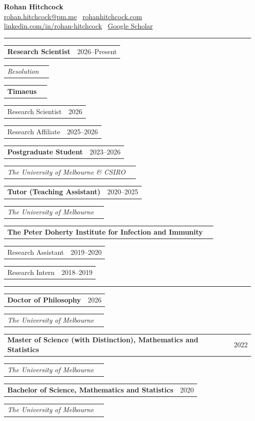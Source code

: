 \documentclass[11pt]{article}
\makeatletter
\newcommand{\resumesection}[1]{\par\needspace{5\baselineskip}\vspace{8pt}{\large\bfseries #1}\par\vspace{3pt}\hrule \vspace{5.5pt}}
\newcommand{\leftright}[2]
{\begin{tabularx}{\linewidth}{l@{\extracolsep{\fill}}r}
	#1 &
	#2 \\
\end{tabularx}}
\newcommand{\role}[1]{\hspace*{1em}#1}
\makeatother
\begin{document}
    \begin{center}
        {\LARGE \textbf{Rohan Hitchcock}}\\
        \href{mailto:rohan.hitchcock@pm.me}{rohan.hitchcock@pm.me} \textbullet \,
        \href{https://rohanhitchcock.com}{rohanhitchcock.com} \\
        \href{http://linkedin.com/in/rohan-hitchcock}{linkedin.com/in/rohan-hitchcock} \textbullet \,
        \href{https://scholar.google.com/citations?user=Ejl7aSgAAAAJ}{Google Scholar}
    \end{center}

    \resumesection{Experience}

        \leftright{\textbf{Research Scientist}}{2026--Present}
        \leftright{\textit{Resolution}}{}

        \medskip

        \leftright{\textbf{Timaeus}}{}
        \leftright{\role{Research Scientist}}{2026}
        \leftright{\role{Research Affiliate}}{2025--2026}

        \medskip

        \leftright{\textbf{Postgraduate Student}}{2023--2026}
        \leftright{\textit{The University of Melbourne \& CSIRO}}{}

        \medskip

        \leftright{\textbf{Tutor (Teaching Assistant)}}{2020--2025}
        \leftright{\textit{The University of Melbourne}}{}

        \medskip

        \leftright{\textbf{The Peter Doherty Institute for Infection and Immunity}}{}
        \leftright{\role{Research Assistant}}{2019--2020}
        \leftright{\role{Research Intern}}{2018--2019}

    \resumesection{Education}

        \leftright{\textbf{Doctor of Philosophy}}{2026}
        \leftright{\textit{The University of Melbourne}}{}

        \medskip

        \leftright{\textbf{Master of Science (with Distinction), Mathematics and Statistics}}{2022}
        \leftright{\textit{The University of Melbourne}}{}

        \medskip

        \leftright{\textbf{Bachelor of Science, Mathematics and Statistics}}{2020}
        \leftright{\textit{The University of Melbourne}}{}

        \medskip
\end{document}
